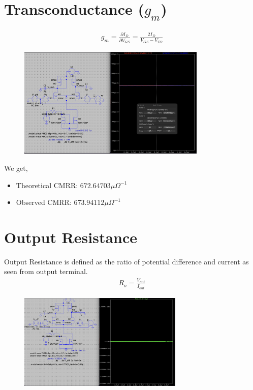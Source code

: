 \documentclass[12pt,a4paper]{article}
\begin{document}
\section{Transconductance ($g_m$)}
\begin{align*}
g_m = \frac{\partial I_D}{\partial V_{GS}}= \frac{2I_D}{V_{GS}-V_{TO}}
\end{align*}
\vspace{6pt}
\begin{figure}[H]
    \centering
    \includegraphics[width=0.8\textwidth]{figs/trans.png}
\end{figure}
We get,
\begin{itemize}
    \item Theoretical CMRR: $672.64703\mu \Omega^{-1}$
    \item Observed CMRR: $673.94112\mu\Omega^{-1}$
\end{itemize}

\vspace{10pt}
\section{Output Resistance}
Output Resistance is defined as the ratio of potential difference and current as seen from output terminal.
\begin{align*}
    R_o = \frac{V_{out}}{I_{out}}
\end{align*}
\begin{figure}[H]
    \centering
    \includegraphics[width=0.7\textwidth]{Simluations/Experiment_4/figs/output_resistance.png}
\end{figure}
\vspace{10pt}
\end{document}

